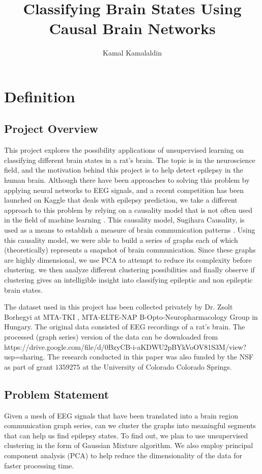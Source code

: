 \documentclass[journal,12pt,onecolumn,draftclsnofoot]{IEEEtran}  %
\title{Classifying Brain States Using Causal Brain Networks}
\author{Kamal Kamalaldin}
\begin{document}
\maketitle

\section{Definition}
\subsection{Project Overview}
This project explores the possibility applications of unsupervised learning on classifying different brain states in a rat's brain. The topic is in the neuroscience field, and the motivation behind this project is to help detect epilepsy in the human brain. Although there have been approaches to solving this problem by applying neural networks to EEG signals, and a recent competition has been launched on Kaggle that deals with epilepsy prediction, we take a different approach to this problem by relying on a causality model that is not often used in the field of machine learning \cite{KaggleEpilepsy2016}. This causality model, Sugihara Causality, is used as a means to establish a measure of brain communication patterns \cite{Sugihara2012}. Using this causality model, we were able to build a series of graphs each of which (theoretically) represents a snapshot of brain communication. Since these graphs are highly dimensional, we use PCA to attempt to reduce its complexity before clustering. we then analyze different clustering possibilities and finally observe if clustering gives an intelligible insight into classifying epileptic and non epileptic brain states. 


The dataset used in this project has been collected privately by Dr. Zsolt Borhegyi at MTA-TKI , MTA-ELTE-NAP B-Opto-Neuropharmacology Group in Hungary. The original data consisted of EEG recordings of a rat's brain. The processed (graph series) version of the data can be downloaded from https://drive.google.com/file/d/0BzyCB-i-aKDWU2pBYkVoOV81S3M/view?usp=sharing. The research conducted in this paper was also funded by the NSF as part of grant $1359275$ at the University of Colorado Colorado Springs. 


\subsection{Problem Statement}

Given a mesh of EEG signals that have been translated into a brain region communication graph series, can we cluster the graphs into meaningful segments that can help us find epilepsy states. To find out, we plan to use unsupervised clustering in the form of Gaussian Mixture algorithm. We also employ principal component analysis (PCA) to help reduce the dimensionality of the data for faster processing time.
\end{document}
